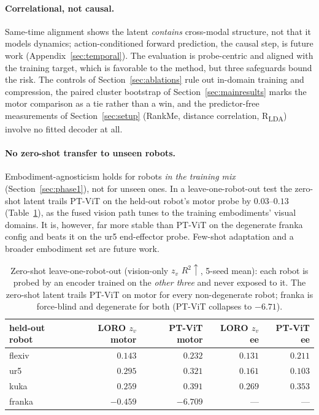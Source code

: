 \documentclass{article}
\begin{document}
\paragraph{Correlational, not causal.} Same-time alignment shows the latent \emph{contains} cross-modal structure, not that it models dynamics; action-conditioned forward prediction, the causal step, is future work (Appendix~\ref{sec:temporal}). The evaluation is probe-centric and aligned with the training target, which is favorable to the method, but three safeguards bound the risk. The controls of Section~\ref{sec:ablations} rule out in-domain training and compression, the paired cluster bootstrap of Section~\ref{sec:mainresults} marks the motor comparison as a tie rather than a win, and the predictor-free measurements of Section~\ref{sec:setup} (RankMe, distance correlation, R\textsubscript{LDA}) involve no fitted decoder at all.

\paragraph{No zero-shot transfer to unseen robots.} Embodiment-agnosticism holds for robots \emph{in the training mix} (Section~\ref{sec:phase1}), not for unseen ones. In a leave-one-robot-out test the zero-shot latent trails PT-ViT on the held-out robot's motor probe by $0.03$--$0.13$ (Table~\ref{tab:loro}), as the fused vision path tunes to the training embodiments' visual domains. It is, however, far more stable than PT-ViT on the degenerate franka config and beats it on the ur5 end-effector probe. Few-shot adaptation and a broader embodiment set are future work.

\begin{table}[!htbp]
  \centering
  \small
  \caption{Zero-shot leave-one-robot-out (vision-only $z_v$ $R^2\uparrow$, 5-seed mean): each robot is probed by an encoder trained on the \emph{other three} and never exposed to it. The zero-shot latent trails PT-ViT on motor for every non-degenerate robot; franka is force-blind and degenerate for both (PT-ViT collapses to $-6.71$).}
  \label{tab:loro}
  \begin{tabular}{lrrrr}
    \toprule
    held-out robot & LORO $z_v$ motor & PT-ViT motor & LORO $z_v$ ee & PT-ViT ee \\
    \midrule
    flexiv & $0.143$ & $0.232$ & $0.131$ & $0.211$ \\
    ur5    & $0.295$ & $0.321$ & $0.161$ & $0.103$ \\
    kuka   & $0.259$ & $0.391$ & $0.269$ & $0.353$ \\
    franka & $-0.459$ & $-6.709$ & --- & --- \\
    \bottomrule
  \end{tabular}
\end{table}
\end{document}
